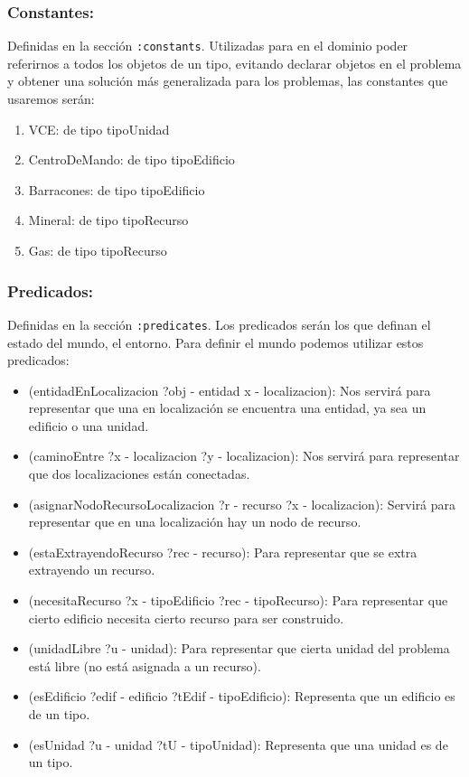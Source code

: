 \documentclass[10pt, spanish]{article}
\begin{document}
\subsubsection{Constantes:}

\begin{multicols}{2}

Definidas en la sección \texttt{:constants}. Utilizadas para en el dominio poder referirnos a todos los objetos de un tipo, evitando declarar objetos en el problema y obtener una solución más generalizada para los problemas, las constantes que usaremos serán:

\begin{enumerate}
  \setlength{\parskip}{0pt}
	\item VCE: de tipo tipoUnidad
	\item CentroDeMando: de tipo tipoEdificio
	\item Barracones: de tipo tipoEdificio
	\item Mineral: de tipo tipoRecurso
	\item Gas: de tipo tipoRecurso
\end{enumerate}
\end{multicols}

\subsubsection{Predicados:}


Definidas en la sección \texttt{:predicates}. Los predicados serán los que definan el estado del mundo, el entorno. Para definir el mundo podemos utilizar estos predicados:

\begin{itemize}
	\item (entidadEnLocalizacion ?obj - entidad x - localizacion): Nos servirá para representar que una en localización se encuentra una entidad, ya sea un edificio o una unidad.
	\item (caminoEntre ?x - localizacion ?y - localizacion): Nos servirá para representar que dos localizaciones están conectadas.
	\item (asignarNodoRecursoLocalizacion ?r - recurso ?x - localizacion): Servirá para representar que en una localización hay un nodo de recurso.
	\item (estaExtrayendoRecurso ?rec - recurso): Para representar que se extra extrayendo un recurso.
	\item (necesitaRecurso ?x - tipoEdificio ?rec - tipoRecurso): Para representar que cierto edificio necesita cierto recurso para ser construido.
	\item (unidadLibre ?u - unidad): Para representar que cierta unidad del problema está libre (no está asignada a un recurso).
	\item (esEdificio ?edif - edificio ?tEdif - tipoEdificio): Representa que un edificio es de un tipo.
	\item (esUnidad ?u - unidad ?tU - tipoUnidad): Representa que una unidad es de un tipo.
	
\end{itemize}
\end{document}
